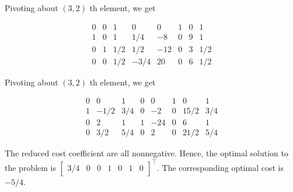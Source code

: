Pivoting about \((3,2)\) th element, we get

\begin{equation*}
	\begin{array}{cccccccc}
		0 & 0 & 1 & 0 & 0 & 1 & 0 & 1 \\
		1 & 0 & 1 & 1 / 4 & -8 & 0 & 9 & 1 \\
		0 & 1 & 1 / 2 & 1 / 2 & -12 & 0 & 3 & 1 / 2 \\
		0 & 0 & 1 / 2 & -3 / 4 & 20 & 0 & 6 & 1 / 2
	\end{array}
\end{equation*}

Pivoting about \((3,2)\) th element, we get

\begin{equation*}
	\begin{array}{cccccccc}
		0 & 0 & 1 & 0 & 0 & 1 & 0 & 1 \\
		1 & -1 / 2 & 3 / 4 & 0 & -2 & 0 & 15 / 2 & 3 / 4 \\
		0 & 2 & 1 & 1 & -24 & 0 & 6 & 1 \\
		0 & 3 / 2 & 5 / 4 & 0 & 2 & 0 & 21 / 2 & 5 / 4
	\end{array}
\end{equation*}

The reduced cost coefficient are all nonnegative. Hence, the optimal solution to the problem is \(\left[\begin{array}{lllllll}3 / 4 & 0 & 0 & 1 & 0 & 1 & 0\end{array}\right]^{\top}\). The corresponding optimal cost is \(-5 / 4\).
